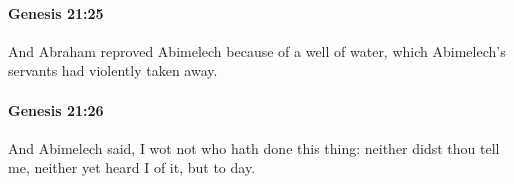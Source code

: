 		\paragraph{Genesis 21:25} %
			\label{GENESIS-21-25}

			And Abraham reproved Abimelech because of a well of water, which Abimelech's servants had violently taken away.


		\paragraph{Genesis 21:26} %
			\label{GENESIS-21-26}

			And Abimelech said, I wot not who hath done this thing: neither didst thou tell me, neither yet heard I of it, but to day.


